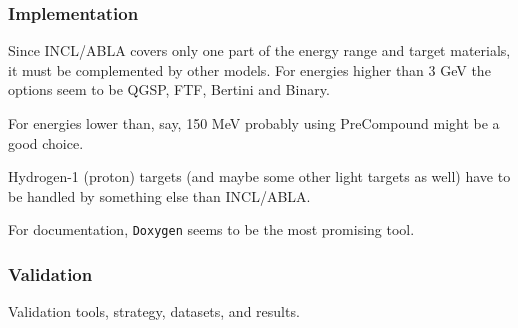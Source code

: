 \begin{appendix}
\subsubsection{Implementation}
Since INCL/ABLA covers only one part of the energy range and target
materials, it must be complemented by other models. For energies higher
than 3 GeV the options seem to be QGSP, FTF, Bertini and Binary.

For energies lower than, say, 150 MeV probably using PreCompound might
be a good choice.

Hydrogen-1 (proton) targets (and maybe some other light targets as
well) have to be handled by something else than INCL/ABLA.

For documentation, {\tt Doxygen} seems to be the most promising tool.

\subsubsection{Validation}

Validation tools, strategy, datasets, and results.







\end{appendix}
